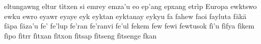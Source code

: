 eltungawng\hspace{2mm}
eltur tìtxen si\hspace{2mm}
emrey\hspace{2mm}
emza'u\hspace{2mm}
eo\hspace{2mm}
ep'ang\hspace{2mm}
epxang\hspace{2mm}
etrìp\hspace{2mm}
Europa\hspace{2mm}
ewktswo\hspace{2mm}
ewku\hspace{2mm}
ewro\hspace{2mm}
eyawr\hspace{2mm}
eyaye\hspace{2mm}
eyk\hspace{2mm}
eyktan\hspace{2mm}
eyktanay\hspace{2mm}
eykyu\hspace{2mm}
fa\hspace{2mm}
fahew\hspace{2mm}
faoi\hspace{2mm}
fayluta\hspace{2mm}
fäkä\hspace{2mm}
fäpa\hspace{2mm}
fäza'u\hspace{2mm}
fe'\hspace{2mm}
fe'lup\hspace{2mm}
fe'ran\hspace{2mm}
fe'ranvi\hspace{2mm}
fe'ul\hspace{2mm}
fekem\hspace{2mm}
few\hspace{2mm}
fewi\hspace{2mm}
fewtusok\hspace{2mm}
fì'u\hspace{2mm}
fìfya\hspace{2mm}
fìkem\hspace{2mm}
fìpo\hspace{2mm}
fìtrr\hspace{2mm}
fìtxan\hspace{2mm}
fìtxon\hspace{2mm}
fìtsap\hspace{2mm}
fìtseng\hspace{2mm}
fìtsenge\hspace{2mm}
fkan\hspace{2mm}
